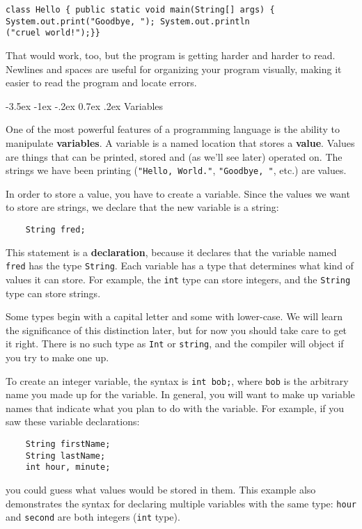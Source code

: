 \documentclass{book}
\makeatletter
\renewcommand{\section}{\@startsection 
    {section} {1} {0mm}%
    {-3.5ex \@plus -1ex \@minus -.2ex}%
    {0.7ex \@plus.2ex}%
    {\normalfont\Large\bfseries}}
\makeatother
\begin{document}
\begin{verbatim}
class Hello { public static void main(String[] args) {
System.out.print("Goodbye, "); System.out.println
("cruel world!");}}
\end{verbatim}
%
That would work, too, but
the program is getting harder and harder to read.  Newlines and
spaces are useful for organizing your program visually, making
it easier to read the program and locate errors.


\section {Variables}

One of the most powerful features of a programming language is the
ability to manipulate {\bf variables}.  A variable is a named location
that stores a {\bf value}.  Values are things that can be printed, stored
and (as we'll see later) operated on.  The strings we have been
printing ({\tt "Hello, World."}, {\tt "Goodbye, "}, etc.)  are values.

In order to store a value, you have to create a variable.  Since
the values we want to store are strings, we declare that
the new variable is a string:

\begin{verbatim}
    String fred;
\end{verbatim}
%
This statement is a {\bf declaration}, because it declares that the
variable named {\tt fred} has the type {\tt String}.  Each variable
has a type that determines what kind of values it can store.  For
example, the {\tt int} type can store integers, and the {\tt String}
type can store strings.


Some types begin with a capital letter and some
with lower-case.  We will learn the significance of this distinction
later, but for now you should take care to get it right.  There is no
such type as {\tt Int} or {\tt string}, and the compiler will object
if you try to make one up.

To create an integer variable, the syntax is {\tt int bob;},
where {\tt bob} is the arbitrary name you made up for the
variable.  In general, you will want to make up variable names
that indicate what you plan to do with the variable.  For
example, if you saw these variable declarations:

\begin{verbatim}
    String firstName;
    String lastName;
    int hour, minute;
\end{verbatim}
%
you could guess what values
would be stored in them.  This example
also demonstrates the syntax for declaring multiple variables
with the same type: {\tt hour} and {\tt second}
are both integers ({\tt int} type).
\end{document}
